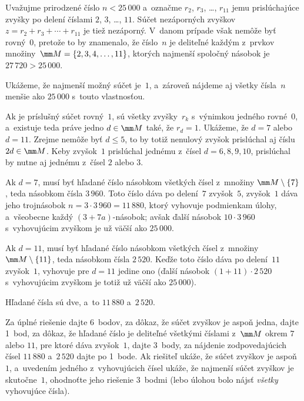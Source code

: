 {%
Uvažujme prirodzené číslo $n<25\,000$ a~označme $r_2$, $r_3$, \dots, $r_{11}$ jemu prislúchajúce zvyšky po delení číslami $2$, $3$, \dots, $11$. Súčet nezáporných zvyškov
$z=r_2+r_3+\cdots+r_{11}$ je tiež nezáporný. V~danom prípade však nemôže byť rovný~$0$, pretože to by znamenalo, že číslo~$n$ je deliteľné každým z~prvkov množiny~$\mm M=\{2, 3, 4,\dots, 11\}$, ktorých najmenší spoločný násobok je $27\,720>25\,000$.

Ukážeme, že najmenší možný súčet je~$1$, a~zároveň nájdeme aj všetky čísla~$n$ menšie ako $25\,000$ s~touto vlastnosťou.

Ak je %
príslušný súčet rovný~$1$, sú všetky zvyšky~$r_k$ s~výnimkou jedného rovné~$0$, a~existuje teda práve jedno $d\in \mm M$ také, že $r_d=1$.
Ukážeme, že $d=7$ alebo $d=11$. Zrejme nemôže byť $d\le5$, to by totiž nenulový zvyšok prislúchal aj číslu $2d\in \mm M$. Keby zvyšok~$1$ prislúchal jednému z~čísel $d=6,8,9,10$, prislúchal by nutne aj jednému z~čísel $2$ alebo $3$.

Ak $d=7$, musí byť hľadané číslo násobkom všetkých čísel z~množiny $\mm M\setminus\{7\}$, teda násobkom čísla $3\,960$. Toto
číslo dáva po delení~$7$ zvyšok~$5$, zvyšok~$1$ dáva jeho trojnásobok $n={3\cdot3\,960}=11\,880$, ktorý vyhovuje podmienkam úlohy, a~všeobecne každý $(3+7a)$-násobok; avšak ďalší násobok $10\cdot3\,960$ s~vyhovujúcim zvyškom je už väčší ako $25\,000$.

Ak $d=11$, musí byť hľadané číslo násobkom všetkých čísel z~množiny $\mm M\setminus\{11\}$, teda násobkom čísla $2\,520$. Keďže toto číslo dáva po delení~$11$ zvyšok~$1$, vyhovuje pre $d=11$ jedine ono (ďalší násobok $(1+11)\cdot2\,520$ s~vyhovujúcim zvyškom je totiž už väčší ako $25\,000$).

\zaver
Hľadané čísla sú dve, a~to $11\,880$ a~$2\,520$.

\nobreak\medskip\petit\noindent
Za úplné riešenie dajte 6~bodov, za dôkaz, že súčet zvyškov je aspoň jedna, dajte 1~bod, za dôkaz, že hľadané číslo je
deliteľné všetkými číslami z~$\mm M$ okrem $7$ alebo $11$, pre ktoré dáva zvyšok~$1$, dajte 3~body, za nájdenie zodpovedajúcich čísel $11\,880$ a~$2\,520$ dajte po 1~bode. Ak riešiteľ ukáže, že súčet zvyškov je aspoň~$1$, a~uvedením jedného z~vyhovujúcich čísel ukáže, že najmenší súčet zvyškov je skutočne~$1$, ohodnoťte jeho riešenie 3~bodmi (lebo úlohou bolo nájsť {\it všetky\/} vyhovujúce čísla).
\endpetit}

